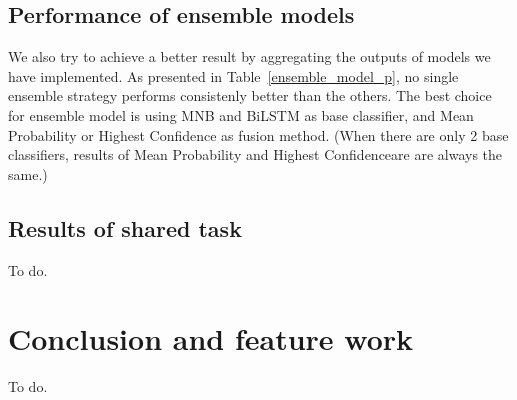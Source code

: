 \documentclass[11pt,a4paper]{article}
\begin{document}
\subsection{Performance of ensemble models}
We also try to achieve a better result by aggregating the outputs of models we have implemented. As presented in Table~\ref{ensemble_model_p}, no single ensemble strategy performs consistenly better than the others. The best choice for ensemble model is using MNB and BiLSTM as base classifier, and Mean Probability or Highest Confidence as fusion method. (When there are only 2 base classifiers, results of Mean Probability and Highest Confidenceare are always the same.)

\subsection{Results of shared task}
To do.

\section{Conclusion and feature work\label{conclusion and feature work}}
To do.



\end{document}
